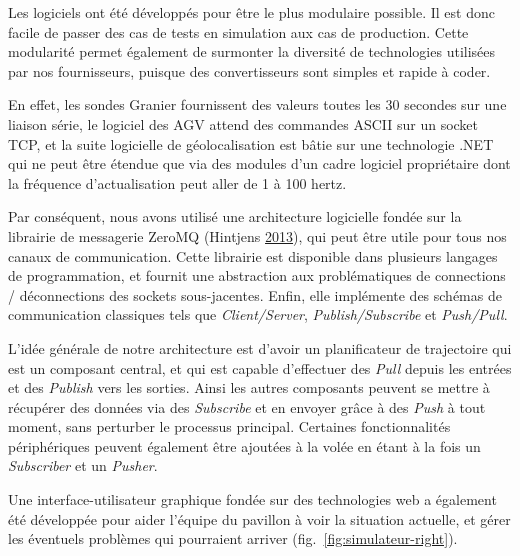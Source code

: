 \documentclass[french,A4paper,]{book}
\begin{document}
Les logiciels ont été développés pour être le plus modulaire possible.
Il est donc facile de passer des cas de tests en simulation aux cas de
production. Cette modularité permet également de surmonter la diversité
de technologies utilisées par nos fournisseurs, puisque des
convertisseurs sont simples et rapide à coder.

En effet, les sondes Granier fournissent des valeurs toutes les 30
secondes sur une liaison série, le logiciel des AGV attend des commandes
ASCII sur un socket TCP, et la suite logicielle de géolocalisation est
bâtie sur une technologie .NET qui ne peut être étendue que via des
modules d'un cadre logiciel propriétaire dont la fréquence
d'actualisation peut aller de 1 à 100 hertz.

Par conséquent, nous avons utilisé une architecture logicielle fondée
sur la librairie de messagerie ZeroMQ (Hintjens
\protect\hyperlink{ref-zeromq}{2013}), qui peut être utile pour tous nos
canaux de communication. Cette librairie est disponible dans plusieurs
langages de programmation, et fournit une abstraction aux problématiques
de connections / déconnections des sockets sous-jacentes. Enfin, elle
implémente des schémas de communication classiques tels que
\emph{Client/Server}, \emph{Publish/Subscribe} et \emph{Push/Pull}.

L'idée générale de notre architecture est d'avoir un planificateur de
trajectoire qui est un composant central, et qui est capable d'effectuer
des \emph{Pull} depuis les entrées et des \emph{Publish} vers les
sorties. Ainsi les autres composants peuvent se mettre à récupérer des
données via des \emph{Subscribe} et en envoyer grâce à des \emph{Push} à
tout moment, sans perturber le processus principal. Certaines
fonctionnalités périphériques peuvent également être ajoutées à la volée
en étant à la fois un \emph{Subscriber} et un \emph{Pusher}.

Une interface-utilisateur graphique fondée sur des technologies web a
également été développée pour aider l'équipe du pavillon à voir la
situation actuelle, et gérer les éventuels problèmes qui pourraient
arriver (fig.~\ref{fig:simulateur-right}).
\end{document}
